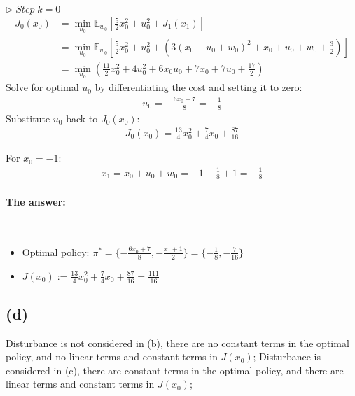 \documentclass[8pt, a4paper, oneside, justified]{article}
\numberwithin{equation}{section}
\begin{document}
$\rhd \;Step\;k=0$
\begin{align}
    J_0(x_0) & = \min_ {u_0}\mathbb{E}_{w_0}[\frac{5}{2}x_0^2+u_0^2+J_1(x_1)] \\
    & = \min_ {u_0}\mathbb{E}_{w_0}[\frac{5}{2}x_0^2+u_0^2+(3(x_0+u_0+w_0)^2+x_0+u_0+w_0+\frac{3}{2})] \\
    & = \min_ {u_0}(\frac{11}{2}x_0^2+4u_0^2+6x_0u_0+7x_0+7u_0+\frac{17}{2})
\end{align}
\hspace{8pt} Solve for optimal $u_0$ by differentiating the cost and setting it to zero:
\begin{align}
    u_0 = -\frac{6x_0+7}{8} = -\frac{1}{8}
\end{align}
\hspace{8pt} Substitute $u_0$ back to $J_0(x_0)$:
\begin{align}
    J_0(x_0) = \frac{13}{4}x_0^2+\frac{7}{4}x_0+\frac{87}{16}
\end{align}

For $x_0 = -1$:
\begin{align}
    x_1 = x_0 + u_0 + w_0 = -1 - \frac{1}{8} + 1 = -\frac{1}{8}
\end{align}

\paragraph*{The answer:}~{}

\begin{itemize}
    \item Optimal policy: 
    $\pi^* = \{-\frac{6x_0+7}{8}, -\frac{x_1+1}{2}\} = \{-\frac{1}{8}, -\frac{7}{16}\}$
    \item $J(x_0):=\frac{13}{4}x_0^2+\frac{7}{4}x_0+\frac{87}{16} = \frac{111}{16}$
    
\end{itemize}

\subsection*{(d)}

Disturbance is not considered in (b), there are no constant terms in the optimal policy, 
and no linear terms and constant terms in $J(x_0)$;
Disturbance is considered in (c), there are constant terms in the optimal policy, 
and there are linear terms and constant terms in $J(x_0)$;

\newpage
\end{document}
